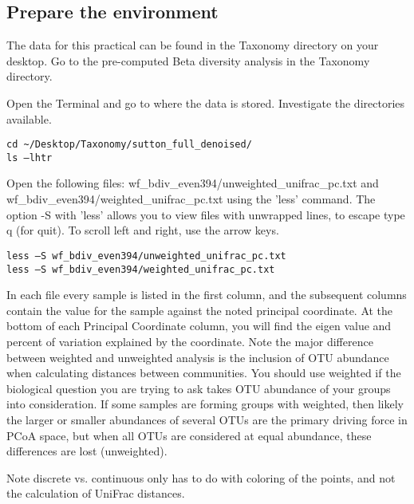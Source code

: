 \subsection{Prepare the environment}
The data for this practical can be found in the Taxonomy directory on your desktop. Go to the pre-computed Beta diversity analysis in the Taxonomy directory. 

\begin{steps}

Open the Terminal and go to where the data is stored. Investigate the directories available.

\begin{lstlisting}
cd ~/Desktop/Taxonomy/sutton_full_denoised/
ls –lhtr
\end{lstlisting}
\end{steps}

\begin{steps}
Open the following files:
wf\_bdiv\_even394/unweighted\_unifrac\_pc.txt and wf\_bdiv\_even394/weighted\_unifrac\_pc.txt 
using the 'less' command. The option -S with 'less' allows you to view files with unwrapped lines, 
to escape type q (for quit). To scroll left and right, use the arrow keys.
\begin{lstlisting}
less –S wf_bdiv_even394/unweighted_unifrac_pc.txt
less –S wf_bdiv_even394/weighted_unifrac_pc.txt
\end{lstlisting}
\end{steps}

In each file every sample is listed in the first column, and the subsequent columns contain the value for the sample against the noted principal coordinate. At the bottom of each Principal Coordinate column, you will find the eigen value and percent of variation explained by the coordinate. 
Note the major difference between weighted and unweighted analysis is the inclusion of OTU abundance when calculating distances between communities. You should use weighted if the biological question you are trying to ask takes OTU abundance of your groups into consideration. If some samples are forming groups with weighted, then likely the larger or smaller abundances of several OTUs are the primary driving force in PCoA space, but when all OTUs are considered at equal abundance, these differences are lost (unweighted).

Note discrete vs. continuous only has to do with coloring of the points, and not the calculation of UniFrac distances.


